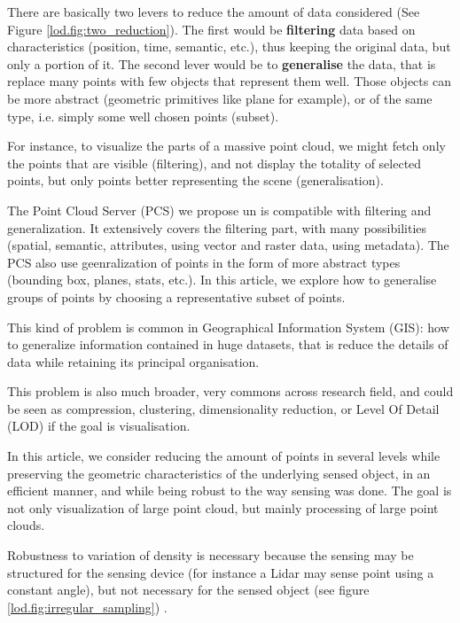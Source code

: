 	
	There are basically two levers to reduce the amount of data considered (See Figure \ref{lod.fig:two_reduction}). The first would be \textbf{filtering} data based on characteristics (position, time, semantic, etc.), thus keeping the original data, but only a portion of it.
	The second lever would be to \textbf{generalise} the data, that is replace many points with few objects that represent them well. Those objects can be more abstract (geometric primitives like plane for example), or of the same type, i.e. simply some well chosen points (subset).
	
	For instance, to visualize the parts of a massive point cloud, we might fetch only the points that are visible (filtering),
	and not display the totality of selected points, but only points better representing the scene (generalisation).
	
	The Point Cloud Server (PCS) we propose un \cite{cura2015} is compatible with filtering and generalization. It extensively covers the filtering part, with many possibilities (spatial, semantic, attributes, using vector and raster data, using metadata). The PCS also use geenralization of points in the form of more abstract types (bounding box, planes, stats, etc.).
	In this article, we explore how to generalise groups of points by choosing a representative subset of points.
	
	This kind of problem is common in Geographical Information System (GIS): how to generalize information contained in huge datasets, that is reduce the details of data while retaining its principal organisation.
	
	This problem is also much broader, very commons across research field, and could be seen as compression, clustering, dimensionality reduction, or Level Of Detail (LOD) if the goal is visualisation.
	
	In this article, we consider reducing the amount of points in several levels while preserving the geometric characteristics of the underlying sensed object, in an efficient manner, and while being robust to the way sensing was done. The goal is not only visualization of large point cloud, but mainly processing of large point clouds.
	
	Robustness to variation of density is necessary because the sensing may be structured for the sensing device (for instance a Lidar may sense point using a constant angle), but not necessary for the sensed object (see figure \ref{lod.fig:irregular_sampling})
	.
	

